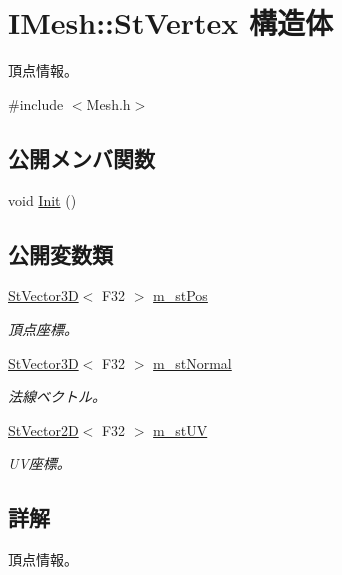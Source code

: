 \hypertarget{struct_i_mesh_1_1_st_vertex}{}\section{I\+Mesh\+:\+:St\+Vertex 構造体}
\label{struct_i_mesh_1_1_st_vertex}


頂点情報。  




{\ttfamily \#include $<$Mesh.\+h$>$}

\subsection*{公開メンバ関数}
\begin{DoxyCompactItemize}
\item 
void \hyperlink{struct_i_mesh_1_1_st_vertex_a55905681162c2e39f66de94ca2cca858}{Init} ()
\end{DoxyCompactItemize}
\subsection*{公開変数類}
\begin{DoxyCompactItemize}
\item 
\hyperlink{struct_st_vector3_d}{St\+Vector3\+D}$<$ F32 $>$ \hyperlink{struct_i_mesh_1_1_st_vertex_aea72250ca5da6cbdd28c6d94226c62f0}{m\+\_\+st\+Pos}
\begin{DoxyCompactList}\small\item\em 頂点座標。 \end{DoxyCompactList}\item 
\hyperlink{struct_st_vector3_d}{St\+Vector3\+D}$<$ F32 $>$ \hyperlink{struct_i_mesh_1_1_st_vertex_a762b51cf598064822d1205944b7f5bce}{m\+\_\+st\+Normal}
\begin{DoxyCompactList}\small\item\em 法線ベクトル。 \end{DoxyCompactList}\item 
\hyperlink{struct_st_vector2_d}{St\+Vector2\+D}$<$ F32 $>$ \hyperlink{struct_i_mesh_1_1_st_vertex_a81cb0271d574730647fdc82a2b5309ad}{m\+\_\+st\+U\+V}
\begin{DoxyCompactList}\small\item\em U\+V座標。 \end{DoxyCompactList}\end{DoxyCompactItemize}


\subsection{詳解}
頂点情報。 

